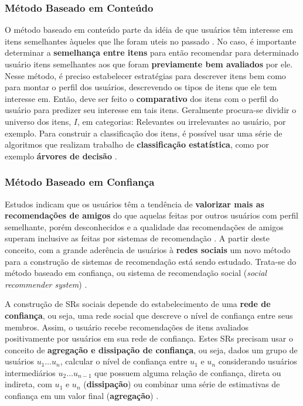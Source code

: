 \documentclass[12pt]{article}
\begin{document}
\subsubsection{Método Baseado em Conteúdo}

O método baseado em conteúdo parte da idéia de que usuários têm interesse em itens semelhantes àqueles que lhe foram uteis 
no passado \cite{ricci2011introduction}. No caso, é importante determinar a \textbf{semelhança entre itens} para então recomendar 
para determinado usuário itens semelhantes aos que foram \textbf{previamente bem avaliados} por ele. Nesse método, 
é preciso estabelecer estratégias para descrever itens bem como para montar o perfil dos usuários, descrevendo os tipos 
de itens que ele tem interesse em. Então, deve ser feito o \textbf{comparativo} dos itens com o perfil do usuário para 
predizer seu interesse em tais itens. Geralmente procura-se dividir o universo dos itens, $I$, em categorias: Relevantes ou 
irrelevantes ao usuário, por exemplo. Para  construir a classificação dos itens, é possível usar uma série de algoritmos que 
realizam trabalho de \textbf{classificação estatística}, como por exemplo \textbf{árvores de decisão} \cite{pazzani2007content}. 

\subsubsection{Método Baseado em Confiança}

Estudos indicam que os usuários têm a tendência de \textbf{valorizar mais as recomendações de amigos} do que aquelas feitas 
por outros usuários com perfil semelhante, porém desconhecidos e a qualidade das recomendações de amigos superam inclusive 
as feitas por sistemas de recomendação \cite{sinha2001comparing}. A partir deste conceito, com a grande aderência de usuários 
à \textbf{redes sociais} um novo método para a construção de sistemas de recomendação está sendo estudado. Trata-se do método 
baseado em confiança, ou sistema de recomendação social (\textit{social recommender system}) \cite{ricci2011introduction}.

A construção de SRs sociais depende do estabelecimento de uma \textbf{rede de confiança}, ou seja, uma rede social que descreve 
o nível de confiança entre seus membros. Assim, o usuário recebe recomendações de itens avaliados positivamente por usuários 
em sua rede de confiança. Estes SRs precisam usar o conceito de \textbf{agregação e dissipação de confiança}, ou seja, 
dados um grupo de usuários $u_1  \dots u_n$, calcular o nível de confiança entre $u_1$ e $u_n$ considerando usuários intermediários
$u_2 \dots u_{n-1}$ que possuem alguma relação de confiança, direta ou indireta, com $u_1$ e $u_n$ (\textbf{dissipação}) ou 
combinar uma série de estimativas de confiança em um valor final (\textbf{agregação}) \cite{victor2011trust}.
\end{document}
